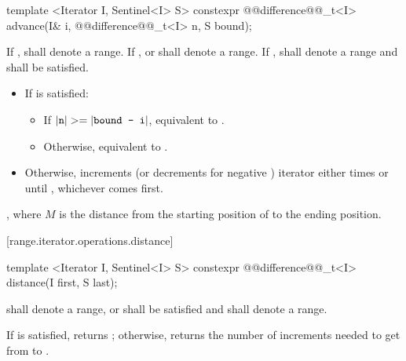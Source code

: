 \begin{itemdecl}
template <Iterator I, Sentinel<I> S>
  constexpr @@difference@@_t<I> advance(I& i, @@difference@@_t<I> n, S bound);
\end{itemdecl}

\begin{itemdescr}
\pnum
\requires
If ,  shall denote a range. If
,  or  shall denote a range. If ,
 shall denote a range and 
shall be satisfied.

\pnum
\effects
\begin{itemize}
\item If  is satisfied:
      \begin{itemize}
      \item If \brk{}$|\texttt{n}| >= |\texttt{bound - i}|$, equivalent to .

      \item Otherwise, equivalent to .
      \end{itemize}

\item Otherwise, increments (or decrements for negative )
      iterator  either  times or until ,
      whichever comes first.
\end{itemize}

\pnum
\returns
{}, where $M$ is the distance from the starting position of
 to the ending position.
\end{itemdescr}

[range.iterator.operations.distance]{}
%

\begin{itemdecl}
template <Iterator I, Sentinel<I> S>
  constexpr @@difference@@_t<I> distance(I first, S last);
\end{itemdecl}

\begin{itemdescr}
\pnum
\requires
{} shall denote a range, or  shall be
satisfied and  shall denote a range.

\pnum
\effects
If  is satisfied, returns ; otherwise,
returns the number of increments needed to get from
to
.
\end{itemdescr}


